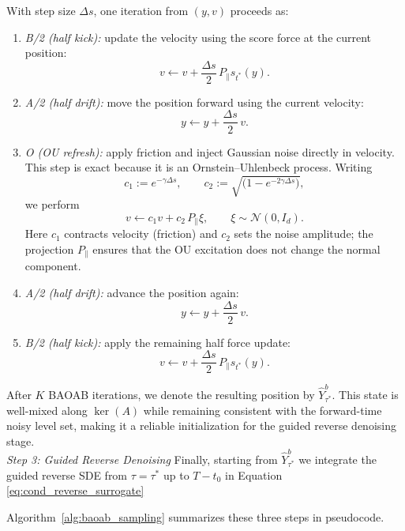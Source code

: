\documentclass[twoside,11pt]{article}
\newcommand{\Nc}{\mathcal{N}}
\numberwithin{equation}{section}
\begin{document}
\smallskip
With step size \(\Delta s\), one iteration from \((y,v)\) proceeds as:
\begin{enumerate}
  \item \emph{B/2 (half kick):} update the velocity using the score force at the current position:
  \[
  v \leftarrow v + \frac{\Delta s}{2}\,P_{\parallel}s_{t^*}(y).
  \]
  \item \emph{A/2 (half drift):} move the position forward using the current velocity:
  \[
  y \leftarrow y + \frac{\Delta s}{2}\,v.
  \]
  \item \emph{O (OU refresh):} apply friction and inject Gaussian noise directly in velocity.
  This step is exact because it is an Ornstein--Uhlenbeck process. Writing
  \[
  c_1 := e^{-\gamma \Delta s},
  \qquad
  c_2 := \sqrt{\big(1-e^{-2\gamma\Delta s}\big)},
  \]
  we perform
  \[
  v \leftarrow c_1 v + c_2\,P_{\parallel}\xi,
  \qquad \xi\sim\Nc(0,I_d).
  \]
  Here \(c_1\) contracts velocity (friction) and \(c_2\) sets the noise amplitude; the projection \(P_{\parallel}\)
  ensures that the OU excitation does not change the normal component.
  \item \emph{A/2 (half drift):} advance the position again:
  \[
  y \leftarrow y + \frac{\Delta s}{2}\,v.
  \]
  \item \emph{B/2 (half kick):} apply the remaining half force update:
  \[
  v \leftarrow v + \frac{\Delta s}{2}\,P_{\parallel}s_{t^*}(y).
  \]
\end{enumerate}

\smallskip
 After \(K\) BAOAB iterations, we denote the resulting
position by \(\hat Y_{\tau^*}^b\). This state is well-mixed along \(\ker(A)\) while remaining consistent with the
forward-time noisy level set, making it a reliable initialization for the guided reverse denoising stage.
\\
\emph{Step 3: Guided Reverse Denoising}
Finally, starting from \(\hat Y_{\tau^*}^b\) we integrate the guided reverse SDE from \(\tau =\tau^*\) up to $T-t_0$ in Equation \eqref{eq:cond_reverse_surrogate} 


\medskip
Algorithm~\ref{alg:baoab_sampling} summarizes these three steps in pseudocode.
\end{document}
